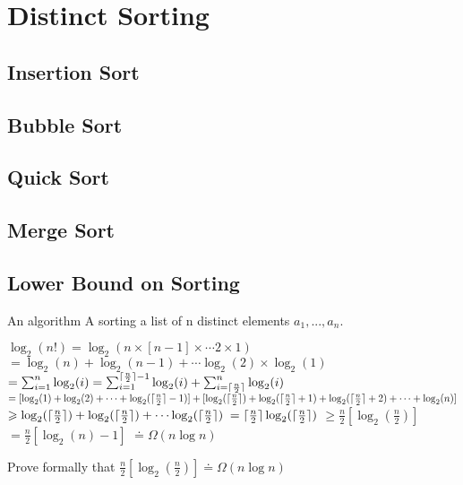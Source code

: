 
\chapter{Distinct Sorting}


\section{Insertion Sort}

\section{Bubble Sort}

\section{Quick Sort}

\section{Merge Sort}




\section{Lower Bound on Sorting}



An algorithm A sorting a list of n distinct elements $a_1, . . ., a_n$.

$\log_2(n!) = \log_2(n \times [n-1] \times \cdots 2 \times 1)$
$= \log_2(n) + \log_2(n-1) + \cdots \log_2(2) \times \log_2(1)$
$= \sum^n_{i=1}\log_2(i) = \sum^{\lceil\frac{n}{2}\rceil-1}_{i=1}\log_2(i) + \sum^{n}_{i=\lceil\frac{n}{2}\rceil}\log_2(i)$
$= [\log_2(1) + \log_2(2) + \cdots + \log_2(\lceil\frac{n}{2}\rceil - 1)] + 
[\log_2(\lceil\frac{n}{2}\rceil) + \log_2(\lceil\frac{n}{2}\rceil + 1) + \log_2(\lceil\frac{n}{2}\rceil + 2) + \cdots
+ \log_2(n)]$ 
$ \geqslant  \log_2(\lceil\frac{n}{2}\rceil) + \log_2(\lceil\frac{n}{2}\rceil) + \cdots \log_2(\lceil\frac{n}{2}\rceil)$ 
$ = \lceil\frac{n}{2}\rceil \log_2(\lceil\frac{n}{2}\rceil)$
$ \geqslant \frac{n}{2} [\log_2(\frac{n}{2})]$
$ = \frac{n}{2}[\log_2(n) - 1]$
$ \doteq \Omega(n \log n)$

\begin{example}
Prove formally that $ \frac{n}{2}[\log_2(\frac{n}{2})] \doteq \Omega(n \log n)$ 
\end{example}